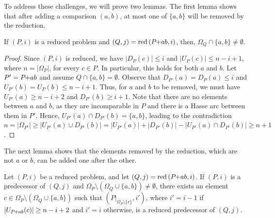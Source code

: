 \documentclass[a4paper,UKenglish,cleveref, autoref, thm-restate]{lipics-v2021}
\newcommand{\pchild}[3]{{#1}\kern-1pt{+}{#2}{#3}}
\newcommand{\reduced}[1]{\operatorname{red}{#1}}
\newcommand{\less}[2]{D_{#1}(#2)}
\newcommand{\greater}[2]{U_{#1}(#2)}
\begin{document}
To address these challenges, we will prove two lemmas.
The first lemma shows that after adding a comparison $(a, b)$, at most one of $\{a, b\}$ will be removed by the reduction.

\begin{lemma} \label{lemma:remove_only_last_element_edge}
  If $(P, i)$ is a reduced problem and $(Q, j) = \reduced{(\pchild{P}{a}{b}, i)}$, then, $\Omega_Q \cap \{a, b\} \neq \emptyset$.
\end{lemma}

\begin{proof}
  Since $(P, i)$ is reduced, we have $|\less{P}{c}| \leq i$ and $|\greater{P}{c}| \leq n - i + 1$, where $n = |\Omega_P|$, for every $c \in P$.
  In particular, this holds for both $a$ and $b$.
  Let $P' = \pchild{P}{a}{b}$ and assume $Q \cap \{a, b\} = \emptyset$.
  Observe that $\less{P'}{a} = \less{P}{a} \leq i$ and $\greater{P'}{b} = \greater{P}{b} \leq n - i + 1$.
  Thus, for $a$ and $b$ to be removed, we must have $\greater{P'}{a} \geq n - i + 2$ and $\less{P'}{b} \geq i + 1$.
  Note that there are no elements between $a$ and $b$, as they are incomparable in $P$ and there is a Hasse arc between them in $P'$.
  Hence, $\greater{P'}{a} \cap \less{P'}{b} = \{a, b\}$, leading to the contradiction $n = |\Omega_{P'}| \ge |\greater{P'}{a} \cup \less{P'}{b}| = |\greater{P'}{a}| + |\less{P'}{b}| - |\greater{P'}{a} \cap \less{P'}{b}| \ge n + 1$.
\end{proof}

The next lemma shows that the elements removed by the reduction, which are not $a$ or $b$, can be added one after the other.

\begin{lemma} \label{lemma:remove_elements_iteratively}
  Let $(P, i)$ be a reduced problem, and let $(Q, j) = \reduced{(\pchild{P}{a}{b}, i)}$.
  If $(P, i)$ is a predecessor of $(Q, j)$ and $\Omega_P \setminus (\Omega_Q \cup \{a, b\}) \neq \emptyset$, there exists an element $c \in \Omega_P \setminus (\Omega_Q \cup \{a, b\})$ such that $(P|_{\Omega_P \setminus \{c\}}, i')$, where $i' = i - 1$ if $|\greater{\pchild{P}{a}{b}}{c}| \ge n - i + 2$ and $i' = i$ otherwise, is a reduced predecessor of $(Q, j)$.
\end{lemma}
\end{document}
